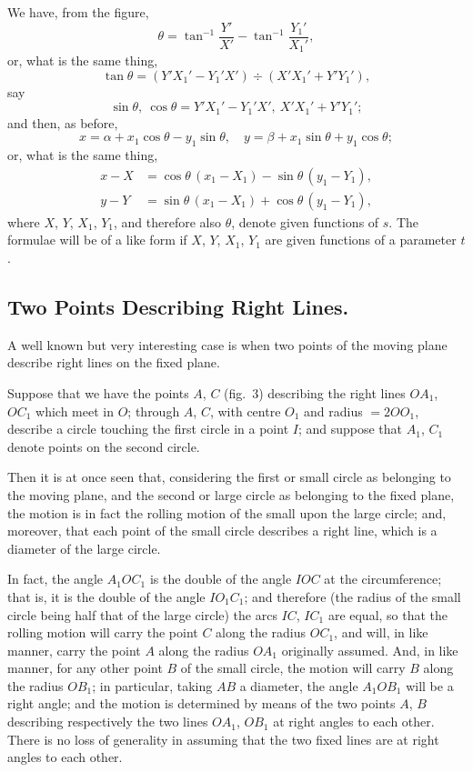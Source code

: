 \documentclass[12pt,a4paper]{article}
\theoremstyle{plain}
\begin{document}
We have, from the figure,
\[
\theta = \tan^{-1}\frac{Y'}{X'} - \tan^{-1}\frac{Y_1'}{X_1'},
\]
or, what is the same thing,
\[
\tan\theta = (Y'X_1' - Y_1'X') \div (X'X_1' + Y'Y_1'),
\]
say
\[
\sin\theta,\ \cos\theta = Y'X_1'-Y_1'X',\ X'X_1'+Y'Y_1';
\]
and then, as before,
\[
x = \alpha + x_1\cos\theta - y_1\sin\theta,\quad
y = \beta + x_1\sin\theta + y_1\cos\theta;
\]
or, what is the same thing,
\begin{align*}
x - X &= \cos\theta\,(x_1-X_1) - \sin\theta\,(y_1-Y_1),\\
y - Y &= \sin\theta\,(x_1-X_1) + \cos\theta\,(y_1-Y_1),
\end{align*}
where $X$, $Y$, $X_1$, $Y_1$, and therefore also $\theta$, denote given functions
of $s$. The formulae will be of a like form if $X$, $Y$, $X_1$, $Y_1$ are
given functions of a parameter $t$.

\subsection*{Two Points Describing Right Lines.}

A well known but very interesting case is when two points of the moving
plane describe right lines on the fixed plane.

Suppose that we have the points $A$, $C$ (fig.~3) describing the right
lines $OA_1$, $OC_1$ which meet in $O$; through $A$, $C$, with centre $O_1$
and radius $=2OO_1$, describe a circle touching the first circle in a point $I$;
and suppose that $A_1$, $C_1$ denote points on the second circle.

Then it is at once seen that, considering the first or small circle as
belonging to the moving plane, and the second or large circle as belonging
to the fixed plane, the motion is in fact the rolling motion of the small upon
the large circle; and, moreover, that each point of the small circle describes
a right line, which is a diameter of the large circle.

In fact, the angle $A_1OC_1$ is the double of the angle $IOC$ at the
circumference; that is, it is the double of the angle $IO_1C_1$; and therefore
(the radius of the small circle being half that of the large circle) the arcs
$IC$, $IC_1$ are equal, so that the rolling motion will carry the point $C$ along
the radius $OC_1$, and will, in like manner, carry the point $A$ along the
radius $OA_1$ originally assumed. And, in like manner, for any other point
$B$ of the small circle, the motion will carry $B$ along the radius $OB_1$;
in particular, taking $AB$ a diameter, the angle $A_1OB_1$ will be a right
angle; and the motion is determined by means of the two points $A$, $B$
describing respectively the two lines $OA_1$, $OB_1$ at right angles to each
other. There is no loss of generality in assuming that the two fixed lines
are at right angles to each other.
\end{document}
